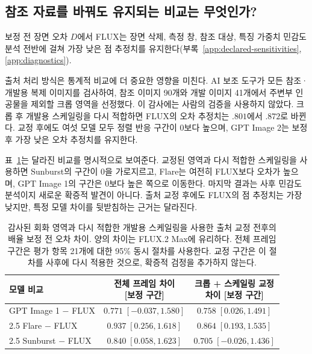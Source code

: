 \documentclass[11pt,a4paper]{article}
\begin{document}
\subsection{참조 자료를 바꿔도 유지되는 비교는 무엇인가?}\label{sec:source-correction}
보정 전 장면 오차 $D$에서 FLUX는 장면 삭제, 측정 창, 참조 대상, 특징 가중치 민감도 분석 전반에 걸쳐 가장 낮은 점 추정치를 유지한다(부록~\ref{app:declared-sensitivities}, \ref{app:diagnostics}).

출처 처리 방식은 통계적 비교에 더 중요한 영향을 미친다. AI 보조 도구가 모든 참조·개발용 복제 이미지를 검사하여, 참조 이미지 90개와 개발 이미지 41개에서 주변부 인공물을 제외할 크롭 영역을 선정했다. 이 감사에는 사람의 검증을 사용하지 않았다. 크롭 후 개발용 스케일링을 다시 적합하면 FLUX의 오차 추정치는 $.801$에서 $.872$로 바뀐다. 교정 후에도 여섯 모델 모두 정렬 반응 구간이 0보다 높으며, GPT Image 2는 보정 후 가장 낮은 오차 추정치를 유지한다.

표~\ref{tab:source-comparison}는 달라진 비교를 명시적으로 보여준다. 교정된 영역과 다시 적합한 스케일링을 사용하면 Sunburst의 구간이 0을 가로지르고, Flare는 여전히 FLUX보다 오차가 높으며, GPT Image 1의 구간은 0보다 높은 쪽으로 이동한다. 마지막 결과는 사후 민감도 분석이지 새로운 확증적 발견이 아니다. 출처 교정 후에도 FLUX의 점 추정치는 가장 낮지만, 특정 모델 차이를 뒷받침하는 근거는 달라진다.

\begin{table}[H]
\centering\small
\begin{tabularx}{\linewidth}{@{}Xcc@{}}
\toprule
모델 비교 & \shortstack{전체 프레임 차이\\{[보정 구간]}} & \shortstack{크롭 + 스케일링 교정\\차이 [보정 구간]}\\\midrule
GPT Image 1 $-$ FLUX & $0.771\;[-0.037,1.580]$ & $0.758\;[0.026,1.491]$\\[2pt]
2.5 Flare $-$ FLUX & $0.937\;[0.256,1.618]$ & $0.864\;[0.193,1.535]$\\[2pt]
2.5 Sunburst $-$ FLUX & $0.840\;[0.058,1.623]$ & $0.705\;[-0.026,1.436]$\\[2pt]
\bottomrule
\end{tabularx}
\caption{감사된 회화 영역과 다시 적합한 개발용 스케일링을 사용한 출처 교정 전후의 배율 보정 전 오차 차이. 양의 차이는 FLUX.2 Max에 유리하다. 전체 프레임 구간은 평가 항목 21개에 대한 95\% 동시 절차를 사용한다. 교정 구간은 이 절차를 사후에 다시 적용한 것으로, 확증적 검정을 추가하지 않는다.}
\label{tab:source-comparison}
\end{table}
\end{document}
